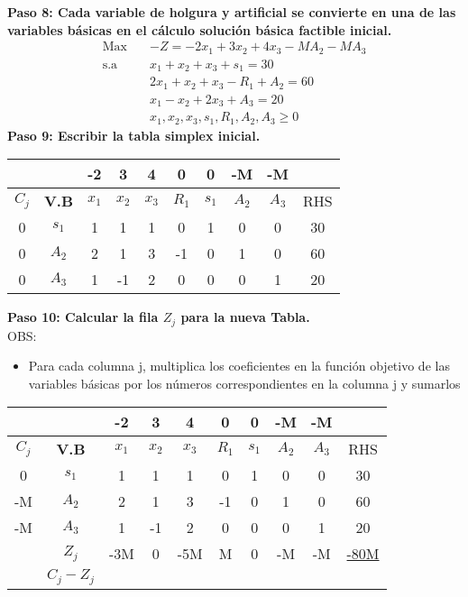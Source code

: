 \documentclass{templateNote}
\begin{document}
\newpage
\noindent
\textbf{Paso 8: Cada variable de holgura y  artificial se convierte en una de las variables básicas en el cálculo solución básica factible inicial.}
\begin{equation*}
    \begin{aligned}
        \text{Max} \quad & -Z = -2x_1 + 3x_2 + 4x_3 - MA_2 - MA_3 \\
        \text{s.a} \quad & x_1 + x_2 + x_3 + s_1 = 30 \\
        & 2x_1 + x_2 + x_3 - R_1 + A_2 = 60 \\
        & x_1 - x_2 + 2x_3 + A_3= 20 \\
        & x_1, x_2, x_3, s_1, R_1, A_2, A_3 \geq 0
    \end{aligned}
\end{equation*}
\textbf{Paso 9: Escribir la tabla simplex inicial.}
\begin{center}
    \begin{tabular}{|c|c|c|c|c|c|c|c|c|c|}
        \hline
        & & -2 & 3 & 4 & 0 & 0 & -M & -M & \\ \hline
        $C_j$ & \textbf{V.B} & $x_1$ & $x_2$ & $x_3$ & $R_1$ & $s_1$ & $A_2$ & $A_3$ & RHS \\ \hline
        0 & $s_1$ & 1 & 1 & 1 & 0 & 1 & 0 & 0 & 30 \\ \hline
        0 & $A_2$ & 2 & 1 & 3 & -1 & 0 & 1 & 0 & 60 \\ \hline
        0 & $A_3$ & 1 & -1 & 2 & 0 & 0 & 0 & 1 & 20 \\ \hline
    \end{tabular}
\end{center}
\textbf{Paso 10: Calcular la fila $Z_j$ para la nueva Tabla.}
\\
OBS:
\begin{itemize}
    \item Para cada columna j, multiplica los coeficientes en la función objetivo de las variables básicas por los números correspondientes en la columna j y sumarlos
\end{itemize}
\begin{center}
    \begin{tabular}{|c|c|c|c|c|c|c|c|c|c|}
        \hline
        & & -2 & 3 & 4 & 0 & 0 & -M & -M & \\ \hline
        $C_j$ & \textbf{V.B} & $x_1$ & $x_2$ & $x_3$ & $R_1$ & $s_1$ & $A_2$ & $A_3$ & RHS \\ \hline
        \cellcolor{green!50}0 & $s_1$ & \cellcolor{green!50}1 & 1 & 1 & 0 & 1 & 0 & 0 & 30 \\ \hline
        \cellcolor{blue!50}-M & $A_2$ & \cellcolor{blue!50}2 & 1 & 3 & -1 & 0 & 1 & 0 & 60 \\ \hline
        \cellcolor{orange!50}-M & $A_3$ & \cellcolor{orange!50}1 & -1 & 2 & 0 & 0 & 0 & 1 & 20 \\ \hline
        & $Z_j$ & \cellcolor{red!50}-3M & 0 & -5M & M & 0 & -M & -M & \underline{-80M} \\ \hline
        & $C_j - Z_j$ & & & & & & & & \\ \hline
    \end{tabular}
\end{center}
\end{document}
